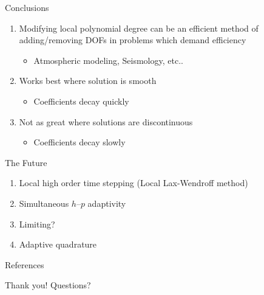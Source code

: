 \documentclass[sansserif]{beamer}
\begin{document}
\begin{frame}{Conclusions}
\begin{enumerate}
\item<1-> Modifying local polynomial degree can be an efficient method of adding/removing DOFs in problems which demand efficiency
	\begin{itemize}
	\item<1-> Atmospheric modeling, Seismology, etc..
	\end{itemize}
\item<2-> Works best where solution is smooth
	\begin{itemize}
	\item<2-> Coefficients decay quickly
	\end{itemize}
\item<3-> Not as great where solutions are discontinuous
	\begin{itemize}
	\item<3-> Coefficients decay slowly
	\end{itemize}
\end{enumerate}
\end{frame}

\begin{frame}{The Future}
\begin{enumerate}
\item Local high order time stepping (Local Lax-Wendroff method)
\item Simultaneous $h$--$p$ adaptivity
\item Limiting?
\item Adaptive quadrature
\end{enumerate}
\end{frame}

\begin{frame}{References}
\nocite{remacle2003adaptive,berger1998adaptive,eskilsson2011hp,tumolo2013semi}
 \small %
\end{frame}

\begin{frame}{Thank you!}
Questions?
\end{frame}
\end{document}
